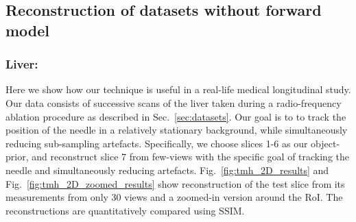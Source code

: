 \documentclass[journal]{IEEEtran}
\begin{document}
\subsection{Reconstruction of datasets without forward model}
\subsubsection{\textbf{Liver:}}
\label{sec:tmh}

Here we show how our technique is useful in a
real-life medical longitudinal study. Our data consists of
successive scans of the liver taken during a radio-frequency ablation
procedure as described in Sec.~\ref{sec:datasets}. Our goal is to to
track the position of the needle in a relatively stationary
background, while simultaneously reducing sub-sampling artefacts.
Specifically, we choose slices 1-6 as our object-prior, and
reconstruct slice 7 from few-views with the specific goal of tracking
the needle and simultaneously reducing
artefacts. Fig.~\ref{fig:tmh_2D_results} and
Fig.~\ref{fig:tmh_2D_zoomed_results} show reconstruction of the test
slice from its measurements from only 30 views and a zoomed-in version
around the RoI. The reconstructions are quantitatively compared using
SSIM.
\end{document}
